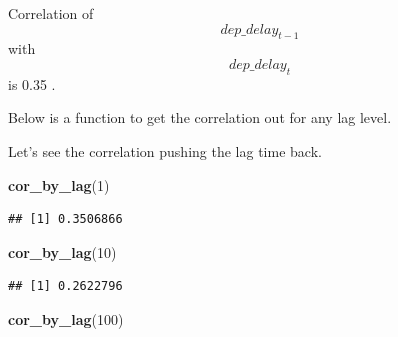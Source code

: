\documentclass[]{book}
\newenvironment{Shaded}{\begin{snugshade}}{\end{snugshade}}
\newcommand{\ControlFlowTok}[1]{\textcolor[rgb]{0.13,0.29,0.53}{\textbf{#1}}}
\newcommand{\DataTypeTok}[1]{\textcolor[rgb]{0.13,0.29,0.53}{#1}}
\newcommand{\DecValTok}[1]{\textcolor[rgb]{0.00,0.00,0.81}{#1}}
\newcommand{\KeywordTok}[1]{\textcolor[rgb]{0.13,0.29,0.53}{\textbf{#1}}}
\newcommand{\NormalTok}[1]{#1}
\newcommand{\OperatorTok}[1]{\textcolor[rgb]{0.81,0.36,0.00}{\textbf{#1}}}
\newcommand{\StringTok}[1]{\textcolor[rgb]{0.31,0.60,0.02}{#1}}
\theoremstyle{definition}
\theoremstyle{definition}
\theoremstyle{definition}
\theoremstyle{remark}
\begin{document}
Correlation of \[dep\_delay_{t-1}\] with \[dep\_delay_{t}\] is 0.35 .

Below is a function to get the correlation out for any lag level.

\begin{Shaded}
\end{Shaded}

Let's see the correlation pushing the lag time back.

\begin{Shaded}
\begin{Highlighting}[]
\KeywordTok{cor_by_lag}\NormalTok{(}\DecValTok{1}\NormalTok{)}
\end{Highlighting}
\end{Shaded}

\begin{verbatim}
## [1] 0.3506866
\end{verbatim}

\begin{Shaded}
\begin{Highlighting}[]
\KeywordTok{cor_by_lag}\NormalTok{(}\DecValTok{10}\NormalTok{)}
\end{Highlighting}
\end{Shaded}

\begin{verbatim}
## [1] 0.2622796
\end{verbatim}

\begin{Shaded}
\begin{Highlighting}[]
\KeywordTok{cor_by_lag}\NormalTok{(}\DecValTok{100}\NormalTok{)}
\end{Highlighting}
\end{Shaded}
\end{document}
